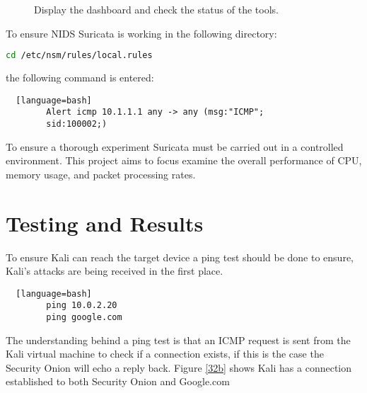 \documentclass[12pt]{article}
\begin{document}
		\begin{center}
		\begin{figure}[H]
			\centering
			\qquad
			\caption{Display the dashboard and check the status of the tools.}
			\label{fig:Starting}
		\end{figure}
		
		\end{center}
		To ensure NIDS Suricata is working in the following directory:
		
		
		\begin{lstlisting}[language=bash]
		cd /etc/nsm/rules/local.rules
		\end{lstlisting}
		
		
		the following command is entered:
		\begin{lstlisting}  [language=bash]
		Alert icmp 10.1.1.1 any -> any (msg:"ICMP";
		sid:100002;)
		\end{lstlisting}
		
		
		
		To ensure a thorough experiment Suricata must be carried out in a controlled environment. This project aims to focus examine the overall performance of CPU, memory usage, and packet processing rates. 
		
		
		
		
		
		
		
		\section{Testing and Results} \label{testing}
		To ensure Kali can reach the target device a ping test should be done to ensure, Kali's attacks are being received in the first place.
		\begin{lstlisting}  [language=bash]
		ping 10.0.2.20
		ping google.com
		\end{lstlisting}
		The understanding behind a ping test is that an ICMP request is sent from the Kali virtual machine to check if a connection exists, if this is the case the Security Onion will echo a reply back. Figure \ref{32b} shows Kali has a connection established to both Security Onion and Google.com  
		
\end{document}
